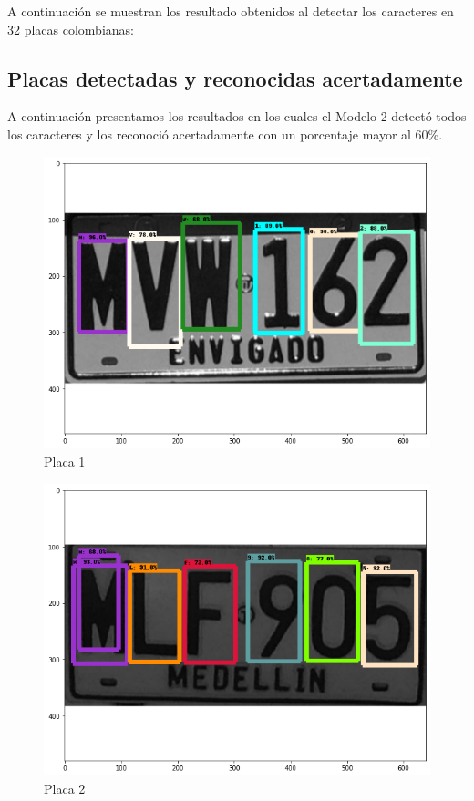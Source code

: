 A continuación se muestran los resultado obtenidos al detectar los caracteres en 32 placas colombianas:

\subsection{Placas detectadas y reconocidas acertadamente}

A continuación presentamos los resultados en los cuales el Modelo 2 detectó todos los caracteres y los reconoció acertadamente con un porcentaje mayor al 60\%.  

\begin{figure}[H]
\centering
\includegraphics[width=0.4\linewidth]{imagenes/caracteres detectados/1.png}
\caption{Placa 1}
\label{fig:caracteres detectados p1}
\end{figure}

\begin{table}[H]
    \centering
    \caption{Detección de caracteres con porcentajes de acierto placa 1}
    \label{tab:p1}
\end{table}

\begin{figure}[H]
\centering
\includegraphics[width=0.4\linewidth]{imagenes/caracteres detectados/2.png}
\caption{Placa 2}
\label{fig:caracteres detectados p2}
\end{figure}

